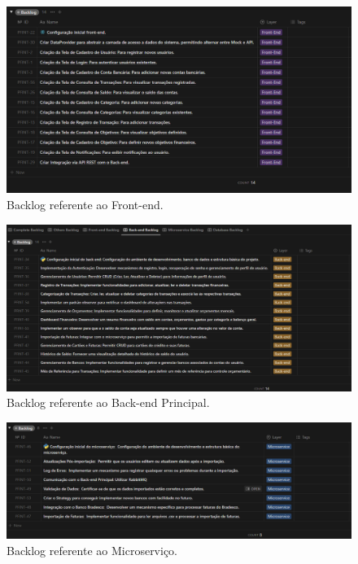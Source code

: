 \begin{figure}[ht]
	\centering
	\includegraphics[width=1\linewidth]{Textuais/images/backlog-front-end.png}
	\caption{Backlog referente ao Front-end.}
	\label{fig:backlog-front-end}
\end{figure}

\begin{figure}[ht]
	\centering
	\includegraphics[width=1\linewidth]{Textuais/images/backlog-back-end.png}
	\caption{Backlog referente ao Back-end Principal.}
	\label{fig:backlog-back-end}
\end{figure}

\begin{figure}[ht]
	\centering
	\includegraphics[width=1\linewidth]{Textuais/images/backlog-microservice.png}
	\caption{Backlog referente ao Microserviço.}
	\label{fig:backlog-microservice}
\end{figure}